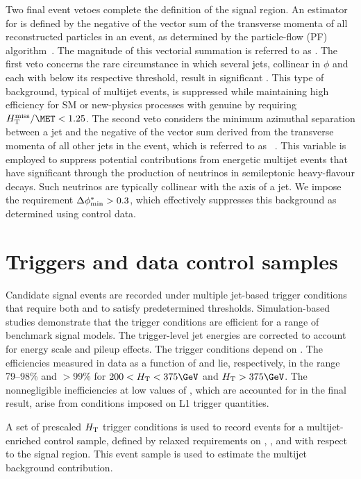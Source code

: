 Two final event vetoes complete the definition of the signal region.
An estimator for \ptvecmiss is defined by the negative of the vector
sum of the transverse momenta of all reconstructed particles in an
event, as determined by the particle-flow (PF)
algorithm~\cite{CMS-PAS-PFT-09-001, CMS-PAS-PFT-10-001}. The magnitude
of this vectorial summation is referred to as \ETmiss. The first veto
concerns the rare circumstance in which several jets, collinear in
$\phi$ and each with \pt below its respective threshold, result in
significant \HTmiss. This type of background, typical of multijet
events, is suppressed while maintaining high efficiency for SM or
new-physics processes with genuine \ptvecmiss by requiring $\HTmiss /
\MET < 1.25$. The second veto considers the minimum azimuthal
separation between a jet and the negative of the vector sum derived
from the transverse momenta of all other jets in the event, which is
referred to as \dphi~\cite{RA1Paper}. This variable is employed to
suppress potential contributions from energetic multijet events that
have significant \ptvecmiss through the production of neutrinos in
semileptonic heavy-flavour decays. Such neutrinos are typically
collinear with the axis of a jet. We impose the requirement $\Delta\phi^{*}_\text{min} >
0.3$, which effectively suppresses this background as determined using
control data.

\section{Triggers and data control samples \label{sec:triggers}}

Candidate signal events are recorded under multiple jet-based trigger
conditions that require both \scalht and \alphat to satisfy
predetermined thresholds. Simulation-based studies demonstrate that
the trigger conditions are efficient for a range of benchmark signal
models. The trigger-level jet energies are corrected to account for
energy scale and pileup effects. The trigger conditions depend on
\scalht.  The efficiencies measured in data as a function of \njet and
\scalht lie, respectively, in the range 79--98\% and $>$99\% for $200
< \scalht < 375\GeV$ and $\scalht > 375\GeV$. The nonnegligible
inefficiencies at low values of \scalht, which are accounted for in
the final result, arise from conditions imposed on L1 trigger
quantities.

A set of prescaled $H_\text{T}$ trigger conditions is used to record
events for a multijet-enriched control sample, defined by relaxed
requirements on \alphat, \dphi, and \mhtmet with respect to the signal
region. This event sample is used to estimate the multijet background
contribution.

